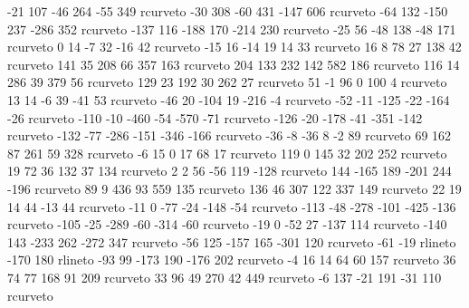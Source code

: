{{-21 107 -46 264 -55 349 rcurveto
-30 308 -60 431 -147 606 rcurveto
-64 132 -150 237 -286 352 rcurveto
-137 116 -188 170 -214 230 rcurveto
-25 56 -48 138 -48 171 rcurveto
0 14 -7 32 -16 42 rcurveto
-15 16 -14 19 14 33 rcurveto
16 8 78 27 138 42 rcurveto
141 35 208 66 357 163 rcurveto
204 133 232 142 582 186 rcurveto
116 14 286 39 379 56 rcurveto
129 23 192 30 262 27 rcurveto
51 -1 96 0 100 4 rcurveto
13 14 -6 39 -41 53 rcurveto
-46 20 -104 19 -216 -4 rcurveto
-52 -11 -125 -22 -164 -26 rcurveto
-110 -10 -460 -54 -570 -71 rcurveto
-126 -20 -178 -41 -351 -142 rcurveto
-132 -77 -286 -151 -346 -166 rcurveto
-36 -8 -36 8 -2 89 rcurveto
69 162 87 261 59 328 rcurveto
-6 15 0 17 68 17 rcurveto
119 0 145 32 202 252 rcurveto
19 72 36 132 37 134 rcurveto
2 2 56 -56 119 -128 rcurveto
144 -165 189 -201 244 -196 rcurveto
89 9 436 93 559 135 rcurveto
136 46 307 122 337 149 rcurveto
22 19 14 44 -13 44 rcurveto
-11 0 -77 -24 -148 -54 rcurveto
-113 -48 -278 -101 -425 -136 rcurveto
-105 -25 -289 -60 -314 -60 rcurveto
-19 0 -52 27 -137 114 rcurveto
-140 143 -233 262 -272 347 rcurveto
-56 125 -157 165 -301 120 rcurveto
-61 -19 rlineto
-170 180 rlineto
-93 99 -173 190 -176 202 rcurveto
-4 16 14 64 60 157 rcurveto
36 74 77 168 91 209 rcurveto
33 96 49 270 42 449 rcurveto
-6 137 -21 191 -31 110 rcurveto
  }
  \end@ClosedObj%
  \ignorespaces%
}
%
\def\psKangaroo{\pst@object{psKangaroo}}%
